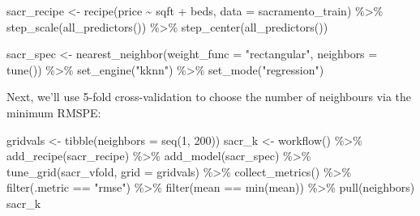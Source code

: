 \documentclass[
]{krantz}
\makeatletter
\newenvironment{Shaded}{\begin{snugshade}}{\end{snugshade}}
\newcommand{\AttributeTok}[1]{\textcolor[rgb]{0.61,0.61,0.61}{#1}}
\newcommand{\DecValTok}[1]{\textcolor[rgb]{0.06,0.06,0.06}{#1}}
\newcommand{\FunctionTok}[1]{\textcolor[rgb]{0,0,0}{#1}}
\newcommand{\NormalTok}[1]{#1}
\newcommand{\OtherTok}[1]{\textcolor[rgb]{0.37,0.37,0.37}{#1}}
\newcommand{\SpecialCharTok}[1]{\textcolor[rgb]{0,0,0}{#1}}
\newcommand{\StringTok}[1]{\textcolor[rgb]{0.5,0.5,0.5}{#1}}
\newenvironment{kframe}{%
\medskip{}
\setlength{\fboxsep}{.8em}
 \def\at@end@of@kframe{}%
 \ifinner\ifhmode%
  \def\at@end@of@kframe{\end{minipage}}%
  \begin{minipage}{\columnwidth}%
 \fi\fi%
 \def\FrameCommand##1{\hskip\@totalleftmargin \hskip-\fboxsep
 \colorbox{shadecolor}{##1}\hskip-\fboxsep
     \hskip-\linewidth \hskip-\@totalleftmargin \hskip\columnwidth}%
 \MakeFramed {\advance\hsize-\width
   \@totalleftmargin\z@ \linewidth\hsize
   \@setminipage}}%
 {\par\unskip\endMakeFramed%
 \at@end@of@kframe}
\renewenvironment{Shaded}{\begin{kframe}}{\end{kframe}}
\makeatother
\begin{document}
\begin{Shaded}
\begin{Highlighting}[]
\NormalTok{sacr\_recipe }\OtherTok{\textless{}{-}} \FunctionTok{recipe}\NormalTok{(price }\SpecialCharTok{\textasciitilde{}}\NormalTok{ sqft }\SpecialCharTok{+}\NormalTok{ beds, }\AttributeTok{data =}\NormalTok{ sacramento\_train) }\SpecialCharTok{\%\textgreater{}\%}
  \FunctionTok{step\_scale}\NormalTok{(}\FunctionTok{all\_predictors}\NormalTok{()) }\SpecialCharTok{\%\textgreater{}\%}
  \FunctionTok{step\_center}\NormalTok{(}\FunctionTok{all\_predictors}\NormalTok{())}

\NormalTok{sacr\_spec }\OtherTok{\textless{}{-}} \FunctionTok{nearest\_neighbor}\NormalTok{(}\AttributeTok{weight\_func =} \StringTok{"rectangular"}\NormalTok{, }\AttributeTok{neighbors =} \FunctionTok{tune}\NormalTok{()) }\SpecialCharTok{\%\textgreater{}\%}
  \FunctionTok{set\_engine}\NormalTok{(}\StringTok{"kknn"}\NormalTok{) }\SpecialCharTok{\%\textgreater{}\%}
  \FunctionTok{set\_mode}\NormalTok{(}\StringTok{"regression"}\NormalTok{)}
\end{Highlighting}
\end{Shaded}

Next, we'll use 5-fold cross-validation to choose the number of neighbours via the minimum RMSPE:

\begin{Shaded}
\begin{Highlighting}[]
\NormalTok{gridvals }\OtherTok{\textless{}{-}} \FunctionTok{tibble}\NormalTok{(}\AttributeTok{neighbors =} \FunctionTok{seq}\NormalTok{(}\DecValTok{1}\NormalTok{, }\DecValTok{200}\NormalTok{))}
\NormalTok{sacr\_k }\OtherTok{\textless{}{-}} \FunctionTok{workflow}\NormalTok{() }\SpecialCharTok{\%\textgreater{}\%}
  \FunctionTok{add\_recipe}\NormalTok{(sacr\_recipe) }\SpecialCharTok{\%\textgreater{}\%}
  \FunctionTok{add\_model}\NormalTok{(sacr\_spec) }\SpecialCharTok{\%\textgreater{}\%}
  \FunctionTok{tune\_grid}\NormalTok{(sacr\_vfold, }\AttributeTok{grid =}\NormalTok{ gridvals) }\SpecialCharTok{\%\textgreater{}\%}
  \FunctionTok{collect\_metrics}\NormalTok{() }\SpecialCharTok{\%\textgreater{}\%}
  \FunctionTok{filter}\NormalTok{(.metric }\SpecialCharTok{==} \StringTok{"rmse"}\NormalTok{) }\SpecialCharTok{\%\textgreater{}\%}
  \FunctionTok{filter}\NormalTok{(mean }\SpecialCharTok{==} \FunctionTok{min}\NormalTok{(mean)) }\SpecialCharTok{\%\textgreater{}\%}
  \FunctionTok{pull}\NormalTok{(neighbors)}
\NormalTok{sacr\_k}
\end{Highlighting}
\end{Shaded}
\end{document}
